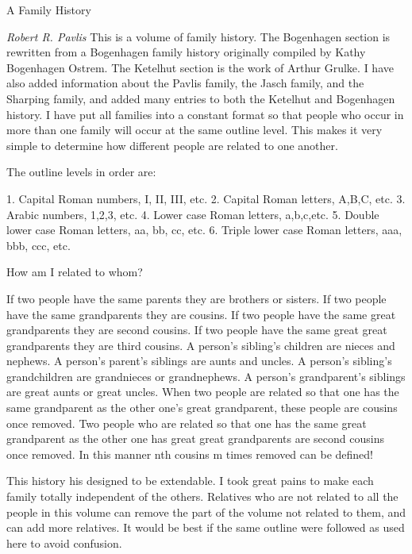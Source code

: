 \documentclass[a4paper]{article}
\begin{document}
\hsize=140mm
\leftskip=-20mm
{\noindent \Huge  A Family History}

{\it Robert R. Pavlis}
\vskip 6mm
	This is a volume of family history.  The Bogenhagen section is rewritten from a Bogenhagen family history originally compiled by Kathy Bogenhagen Ostrem.  The Ketelhut section is the work of Arthur Grulke.  I have also added information about the Pavlis family, the Jasch family, and the Sharping family, and added many entries to both the Ketelhut and Bogenhagen history.  I have put all families into a constant format so that people who occur in more than one family will occur at the same outline level.  This makes it very simple to determine how different people are related to one another.

\noindent   The outline levels in order are:

	1. Capital Roman numbers, I, II, III, etc.	
	2. Capital Roman letters, A,B,C, etc.
	3. Arabic numbers, 1,2,3, etc.
	4. Lower case Roman letters, a,b,c,etc.
	5. Double lower case Roman letters, aa, bb, cc, etc.
	6. Triple lower case Roman letters, aaa, bbb, ccc, etc.  
  
\noindent How am I related to whom?

	If two people have the same parents they are brothers or sisters.
	If two people have the same grandparents they are cousins.
	If two people have the same great grandparents they are second cousins.
	If two people have the same great great grandparents they are third cousins.  
	A person's sibling's children are nieces and nephews.
	A person's parent's siblings are aunts and uncles.
	A person's sibling's grandchildren are grandnieces or grandnephews.
	A person's grandparent's siblings are great aunts or great uncles.
	When two people are related so that one has the same grandparent as the other one's great grandparent, these people are cousins once removed.  
	Two people who are related so that one has the same great grandparent as the other one has great great grandparents are second cousins once removed.
	In this manner nth cousins m times removed can be defined!

	This history his designed to be extendable.  I took great pains to make each family totally independent of the others.  Relatives who are not related to all the people in this volume can remove the part of the volume not related to them, and can add more relatives.  It would be best if the same outline were followed as used here to avoid confusion.

\pagebreak
\end{document}
